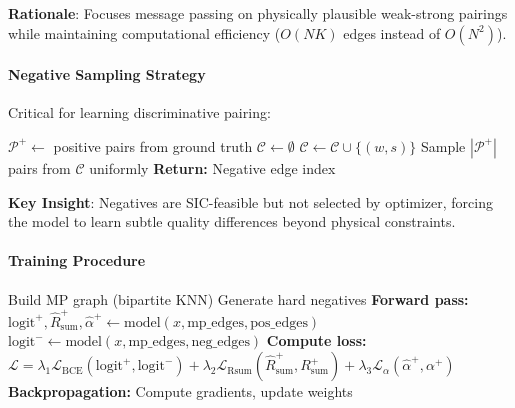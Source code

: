 \documentclass[12pt,a4paper]{article}
\begin{document}
\textbf{Rationale}: Focuses message passing on physically plausible weak-strong pairings while maintaining computational efficiency ($O(NK)$ edges instead of $O(N^2)$).

\paragraph{Negative Sampling Strategy}

Critical for learning discriminative pairing:

\begin{algorithm}[H]
\caption{Hard Negative Sampling}
\begin{algorithmic}[1]
\State $\mathcal{P}^+ \leftarrow$ positive pairs from ground truth
\State $\mathcal{C} \leftarrow \emptyset$ 
            \State $\mathcal{C} \leftarrow \mathcal{C} \cup \{(w,s)\}$
        \EndIf
    \EndIf
\EndFor
\State Sample $|\mathcal{P}^+|$ pairs from $\mathcal{C}$ uniformly 
\State \textbf{Return:} Negative edge index
\end{algorithmic}
\end{algorithm}

\textbf{Key Insight}: Negatives are SIC-feasible but not selected by optimizer, forcing the model to learn subtle quality differences beyond physical constraints.

\paragraph{Training Procedure}

\begin{algorithm}[H]
\caption{One Training Epoch}
\begin{algorithmic}[1]
    \State Build MP graph (bipartite KNN)
    \State Generate hard negatives
    \State \textbf{Forward pass:}
    \State \quad $\text{logit}^+, \hat{R}_{\text{sum}}^+, \hat{\alpha}^+ \leftarrow \text{model}(x, \text{mp\_edges}, \text{pos\_edges})$
    \State \quad $\text{logit}^- \leftarrow \text{model}(x, \text{mp\_edges}, \text{neg\_edges})$
    \State \textbf{Compute loss:}
    \State \quad $\mathcal{L} = \lambda_1 \mathcal{L}_{\text{BCE}}(\text{logit}^+, \text{logit}^-) + \lambda_2 \mathcal{L}_{\text{Rsum}}(\hat{R}_{\text{sum}}^+, R_{\text{sum}}^+) + \lambda_3 \mathcal{L}_{\alpha}(\hat{\alpha}^+, \alpha^+)$
    \State \textbf{Backpropagation:}
    \State \quad Compute gradients, update weights
\EndFor
\end{algorithmic}
\end{algorithm}
\end{document}
